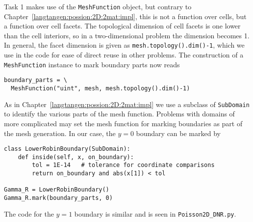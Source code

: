 Task 1 makes use of the {\fontsize{12pt}{12pt}\texttt{MeshFunction}} object, but contrary to
Chapter~\ref{langtangen:possion:2D:2mat:impl}, this is not a function over
cells, but a function over cell facets. The topological dimension of
cell facets is one lower than the cell interiors, so in a two-dimensional
problem the dimension 
becomes 1. In general, the facet dimension 
is given as {\fontsize{12pt}{12pt}\texttt{mesh.topology().dim()-1}},
which we use in the code for ease of direct reuse in other problems.
The construction of a {\fontsize{12pt}{12pt}\texttt{MeshFunction}} instance to mark boundary parts
now reads
\begin{Verbatim}[fontsize=\fontsize{10pt}{10pt},tabsize=8,baselinestretch=1.05,
fontfamily=tt,xleftmargin=7mm]
boundary_parts = \ 
  MeshFunction("uint", mesh, mesh.topology().dim()-1)
\end{Verbatim}
\noindent
As in Chapter~\ref{langtangen:possion:2D:2mat:impl} we
use a subclass of {\fontsize{12pt}{12pt}\texttt{SubDomain}} to identify the various parts
of the mesh function. Problems with domains of more complicated may
set the mesh function for marking boundaries as part of the mesh
generation.
In our case, the $y=0$ boundary can be marked by
\begin{Verbatim}[fontsize=\fontsize{10pt}{10pt},tabsize=8,baselinestretch=1.05,
fontfamily=tt,xleftmargin=7mm]
class LowerRobinBoundary(SubDomain):
    def inside(self, x, on_boundary):
        tol = 1E-14   # tolerance for coordinate comparisons
        return on_boundary and abs(x[1]) < tol

Gamma_R = LowerRobinBoundary()
Gamma_R.mark(boundary_parts, 0)
\end{Verbatim}
\noindent
The code for the $y=1$ boundary is similar and is seen in
{\fontsize{12pt}{12pt}\verb!Poisson2D_DNR.py!}.

